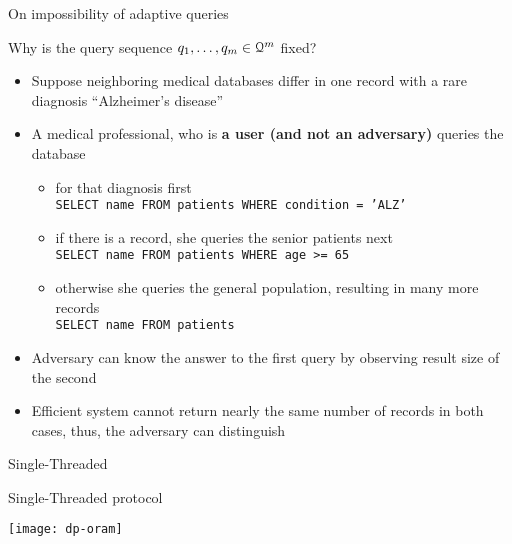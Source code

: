 	\begin{frame}{On impossibility of adaptive queries}

		\begin{block}{Why is the query sequence $\fromNtoM{\query}{1}{m} \in \querySet^m$ fixed?}
			\justify%

			\begin{itemize}
				\item<1-> Suppose neighboring medical databases differ in one record with a rare diagnosis ``Alzheimer's disease''
				\item<2-> A medical professional, who is \textbf{a user (and not an adversary)} queries the database
					\begin{itemize}
						\item
							for that diagnosis first \\
							\texttt{SELECT name FROM patients WHERE condition = 'ALZ'} %

						\item
							if there is a record, she queries the senior patients next \\
							\texttt{SELECT name FROM patients WHERE age >= 65}

						\item
							otherwise she queries the general population, resulting in many more records \\
							\texttt{SELECT name FROM patients}
					\end{itemize}
				\item<3-> \alert{Adversary can know the answer to the first query by observing result size of the second}
				\item<3-> Efficient system cannot return nearly the same number of records in both cases, thus, the adversary can distinguish
			\end{itemize}

		\end{block}

	\end{frame}

	\begin{frame}{Single-Threaded \epsolute{}}

		\begin{block}{Single-Threaded \epsolute{} protocol}

			\vspace*{2ex}
			\centering
			\texttt{[image: dp-oram]}

		\end{block}

	\end{frame}

